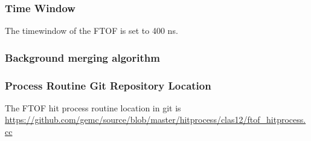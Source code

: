 \subsubsection{Time Window}
The timewindow of the FTOF is set to 400 ns.

\subsubsection{Background merging algorithm}

\subsubsection{Process Routine Git Repository Location}
The FTOF hit process routine location in git is \url{https://github.com/gemc/source/blob/master/hitprocess/clas12/ftof_hitprocess.cc}


